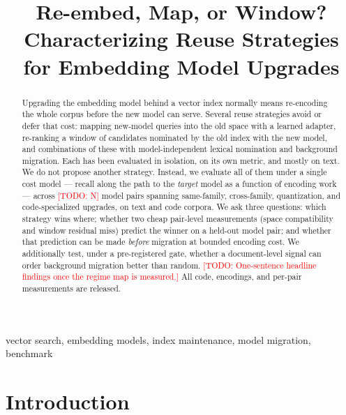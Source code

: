 \documentclass[conference]{IEEEtran}
\newcommand{\todo}[1]{\textcolor{red}{[TODO: #1]}}
\begin{document}
\title{Re-embed, Map, or Window? Characterizing Reuse Strategies\\for Embedding Model Upgrades}

\author{
}

\maketitle

\begin{abstract}
Upgrading the embedding model behind a vector index normally means re-encoding the
whole corpus before the new model can serve. Several reuse strategies avoid or defer
that cost: mapping new-model queries into the old space with a learned adapter,
re-ranking a window of candidates nominated by the old index with the new model, and
combinations of these with model-independent lexical nomination and background
migration. Each has been evaluated in isolation, on its own metric, and mostly on
text. We do not propose another strategy. Instead, we evaluate all of them under a
single cost model --- recall along the path to the \emph{target} model as a function of
encoding work --- across \todo{N} model pairs spanning same-family, cross-family,
quantization, and code-specialized upgrades, on text and code corpora.
We ask three questions: which strategy wins where; whether two cheap pair-level
measurements (space compatibility and window residual miss) predict the winner on a
held-out model pair; and whether that prediction can be made \emph{before} migration
at bounded encoding cost. We additionally test, under a pre-registered gate, whether a
document-level signal can order background migration better than random.
\todo{One-sentence headline findings once the regime map is measured.}
All code, encodings, and per-pair measurements are released.
\end{abstract}

\begin{IEEEkeywords}
vector search, embedding models, index maintenance, model migration, benchmark
\end{IEEEkeywords}

\section{Introduction}
\end{document}
